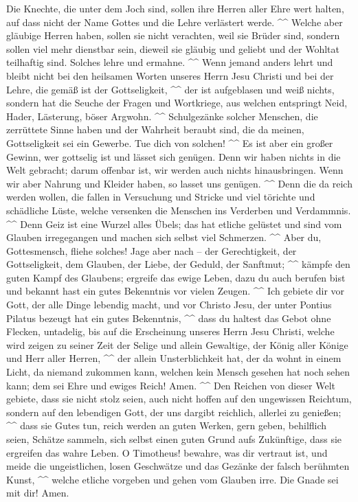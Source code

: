  Die Knechte, die unter dem Joch sind, sollen ihre Herren
aller Ehre wert halten, auf dass nicht der Name Gottes und die Lehre
verlästert werde. \^{}\^{}  Welche aber gläubige Herren
haben, sollen sie nicht verachten, weil sie Brüder sind, sondern sollen
viel mehr dienstbar sein, dieweil sie gläubig und geliebt und der
Wohltat teilhaftig sind. Solches lehre und ermahne. \^{}\^{}
 Wenn jemand anders lehrt und bleibt nicht bei den
heilsamen Worten unseres Herrn Jesu Christi und bei der Lehre, die gemäß
ist der Gottseligkeit, \^{}\^{}  der ist aufgeblasen und
weiß nichts, sondern hat die Seuche der Fragen und Wortkriege, aus
welchen entspringt Neid, Hader, Lästerung, böser Argwohn. \^{}\^{}
 Schulgezänke solcher Menschen, die zerrüttete Sinne haben
und der Wahrheit beraubt sind, die da meinen, Gottseligkeit sei ein
Gewerbe. Tue dich von solchen! \^{}\^{}  Es ist aber ein
großer Gewinn, wer gottselig ist und lässet sich genügen. 
Denn wir haben nichts in die Welt gebracht; darum offenbar ist, wir
werden auch nichts hinausbringen.  Wenn wir aber Nahrung
und Kleider haben, so lasset uns genügen. \^{}\^{}  Denn
die da reich werden wollen, die fallen in Versuchung und Stricke und
viel törichte und schädliche Lüste, welche versenken die Menschen ins
Verderben und Verdammnis. \^{}\^{}  Denn Geiz ist eine
Wurzel alles Übels; das hat etliche gelüstet und sind vom Glauben
irregegangen und machen sich selbst viel Schmerzen. \^{}\^{}
 Aber du, Gottesmensch, fliehe solches! Jage aber nach --
der Gerechtigkeit, der Gottseligkeit, dem Glauben, der Liebe, der
Geduld, der Sanftmut; \^{}\^{}  kämpfe den guten Kampf
des Glaubens; ergreife das ewige Leben, dazu du auch berufen bist und
bekannt hast ein gutes Bekenntnis vor vielen Zeugen. \^{}\^{}
 Ich gebiete dir vor Gott, der alle Dinge lebendig macht,
und vor Christo Jesu, der unter Pontius Pilatus bezeugt hat ein gutes
Bekenntnis, \^{}\^{}  dass du haltest das Gebot ohne
Flecken, untadelig, bis auf die Erscheinung unseres Herrn Jesu Christi,
 welche wird zeigen zu seiner Zeit der Selige und allein
Gewaltige, der König aller Könige und Herr aller Herren, \^{}\^{}
 der allein Unsterblichkeit hat, der da wohnt in einem
Licht, da niemand zukommen kann, welchen kein Mensch gesehen hat noch
sehen kann; dem sei Ehre und ewiges Reich! Amen. \^{}\^{}
 Den Reichen von dieser Welt gebiete, dass sie nicht
stolz seien, auch nicht hoffen auf den ungewissen Reichtum, sondern auf
den lebendigen Gott, der uns dargibt reichlich, allerlei zu genießen;
\^{}\^{}  dass sie Gutes tun, reich werden an guten
Werken, gern geben, behilflich seien,  Schätze sammeln,
sich selbst einen guten Grund aufs Zukünftige, dass sie ergreifen das
wahre Leben.  O Timotheus! bewahre, was dir vertraut ist,
und meide die ungeistlichen, losen Geschwätze und das Gezänke der falsch
berühmten Kunst, \^{}\^{}  welche etliche vorgeben und
gehen vom Glauben irre. Die Gnade sei mit dir! Amen.
